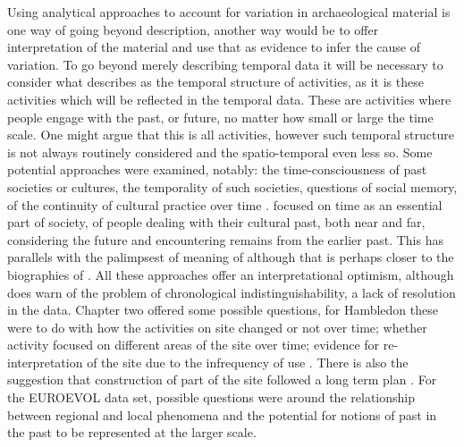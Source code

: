 Using analytical approaches to account for variation in archaeological material is one way of going beyond description, another way would be to offer interpretation of the material and use that as evidence to infer the cause of variation. To go beyond merely describing temporal data it will be necessary to consider what \citet{Lucas:2005fk} describes as the temporal structure of activities, as it is these activities which will be reflected in the temporal data. These are activities where people engage with the past, or future, no matter how small or large the time scale. One might argue that this is all activities, however such temporal structure is not always routinely considered and the spatio-temporal even less so. Some potential approaches were examined, notably: the time-consciousness of past societies or cultures, the temporality of such societies, questions of social memory, of the continuity of cultural practice over time \citep{Lucas:2005fk}. \citet{Bradley:2002fk} focused on time as an essential part of society, of people dealing with their cultural past, both near and far, considering the future and encountering remains from the earlier past. This has parallels with the palimpsest of meaning of \citet{Bailey:2007fk} although that is perhaps closer to the biographies of \citet{10.2307/125007}. All these approaches offer an interpretational optimism, although \citet{Bailey:2007fk} does warn of the problem of chronological indistinguishability, a lack of resolution in the data. Chapter two offered some possible questions, for Hambledon these were to do with how the activities on site changed or not over time; whether activity focused on different areas of the site over time; evidence for re-interpretation of the site due to the infrequency of use \citep[755]{Mercer:2008fk}. There is also the suggestion that construction of part of the site followed a long term plan \citep[760]{Mercer:2008fk}. For the EUROEVOL data set, possible questions were around the relationship between regional and local phenomena and the potential for notions of past in the past to be represented at the larger scale.

